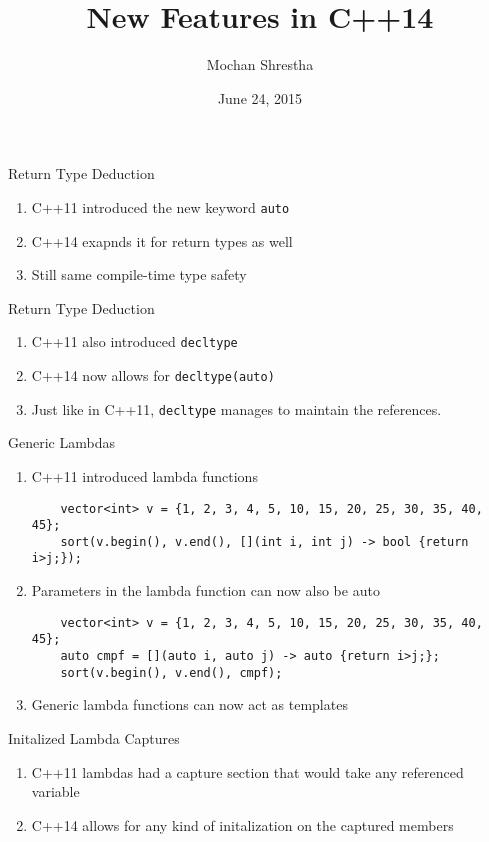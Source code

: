 \documentclass{beamer}
\title{New Features in C++14}
\author{Mochan Shrestha}
\institute{Ann Arbor C++ Meetup}
\date{June 24, 2015}
\begin{document}
\begin{frame}
\titlepage
\end{frame}


\begin{frame}{Return Type Deduction}
\begin{enumerate}
  \item C++11 introduced the new keyword \texttt{auto}
  \item C++14 exapnds it for return types as well
  \item Still same compile-time type safety
\end{enumerate}
\end{frame}

\begin{frame}{Return Type Deduction}
 \begin{enumerate}
  \item C++11 also introduced \texttt{decltype}
  \item C++14 now allows for \texttt{decltype(auto)}
  \item Just like in C++11, \texttt{decltype} manages to maintain the references.
 \end{enumerate}
\end{frame}

\begin{frame}[fragile]{Generic Lambdas}
 \begin{enumerate}
  \item C++11 introduced lambda functions
  \begin{lstlisting}
	vector<int> v = {1, 2, 3, 4, 5, 10, 15, 20, 25, 30, 35, 40, 45};
	sort(v.begin(), v.end(), [](int i, int j) -> bool {return i>j;});
  \end{lstlisting}
  \item Parameters in the lambda function can now also be auto
  \begin{lstlisting}
	vector<int> v = {1, 2, 3, 4, 5, 10, 15, 20, 25, 30, 35, 40, 45};
	auto cmpf = [](auto i, auto j) -> auto {return i>j;};
	sort(v.begin(), v.end(), cmpf);   
  \end{lstlisting}

  \item Generic lambda functions can now act as templates
 \end{enumerate}  
\end{frame}

\begin{frame}{Initalized Lambda Captures}
 \begin{enumerate}
  \item C++11 lambdas had a capture section that would take any referenced variable
  \item C++14 allows for any kind of initalization on the captured members
 \end{enumerate}

\end{frame}
\end{document}
